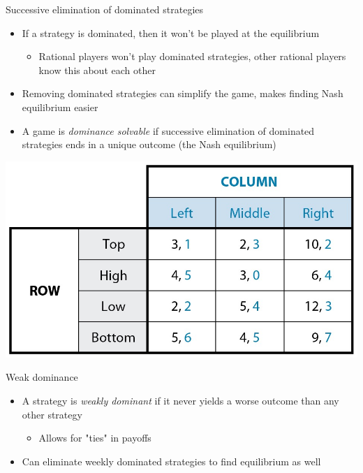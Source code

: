 \documentclass[10pt]{beamer}
\begin{document}
\begin{frame}[label={sec:orgd7940a1}]{}
\alert{Successive elimination of dominated strategies}
\begin{itemize}
\item If a strategy is dominated, then it won't be played at the equilibrium
\begin{itemize}
\item Rational players won't play dominated strategies, other rational players know this about each other
\end{itemize}
\item Removing dominated strategies can simplify the game, makes finding Nash equilibrium easier
\item A game is \emph{dominance solvable} if successive elimination of dominated strategies ends in a unique outcome (the Nash equilibrium)
\end{itemize}
\end{frame}


\begin{frame}[label={sec:orgfdf85bf}]{}
\begin{center}
\includegraphics[width=.75\textwidth]{./img/GAMES4_FIG04.01.jpg}
\end{center}
\end{frame}


\begin{frame}[label={sec:orgaf8fc16}]{}
\alert{Weak dominance}
\begin{itemize}
\item A strategy is \emph{weakly dominant} if it never yields a worse outcome than any other strategy
\begin{itemize}
\item Allows for "ties" in payoffs
\end{itemize}
\item Can eliminate weekly dominated strategies to find equilibrium as well
\end{itemize}
\end{frame}
\end{document}
